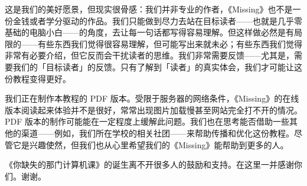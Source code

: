 这是我们的美好愿景，但现实很骨感：我们并非专业的作者，《Missing》也不是一份金钱或者学分驱动的作品。我们只能做到尽力去站在目标读者——也就是几乎零基础的电脑小白——的角度，去让每一句话都写得容易理解。但这样做必然是有局限的——有些东西我们觉得很容易理解，但可能写出来就未必；有些东西我们觉得非常有必要介绍，但它反而会干扰读者的思维。我们非常需要反馈——尤其是，需要我们的「目标读者」的反馈。只有了解到「读者」的真实体会，我们才可能让这份教程变得更好。

我们正在制作本教程的 PDF 版本。受限于服务器的网络条件，《Missing》的在线版本阅读起来体验并不是很好，常常出现图片加载慢甚至网站完全打不开的情况。PDF 版本的制作可能能在一定程度上缓解此问题。我们也在思考能否借助一些其他的渠道——例如，我们所在学校的相关社团——来帮助传播和优化这份教程。尽管它是兴趣使然，但我们也从心里希望我们的《Missing》能帮助到更多的人。

《你缺失的那门计算机课》的诞生离不开很多人的鼓励和支持。在这里一并感谢你们。谢谢。

